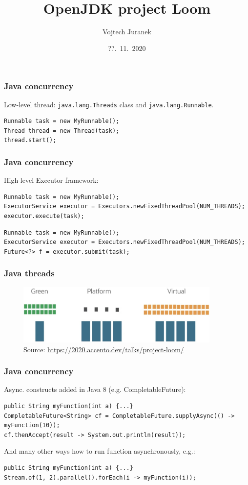 \documentclass[10pt,utf8]{beamer}
\title{OpenJDK project Loom}
\author{Vojtech Juranek}
\institute[Red Hat]{oVirt storage team}
\date{??.~11.~2020}
\begin{document}
\begin{frame}
	\titlepage
\end{frame}

\begin{frame}[fragile]
    \frametitle{Java concurrency}
    Low-level thread: \texttt{java.lang.Threads} class and \texttt{java.lang.Runnable}.
    \begin{lstlisting}[style=java]
Runnable task = new MyRunnable();
Thread thread = new Thread(task);
thread.start();
    \end{lstlisting}
\end{frame}

\begin{frame}[fragile]
    \frametitle{Java concurrency}
    High-level Executor framework:
    \begin{lstlisting}[style=java]
Runnable task = new MyRunnable();
ExecutorService executor = Executors.newFixedThreadPool(NUM_THREADS);
executor.execute(task);
    \end{lstlisting}
    
    \vspace{0.5cm}
    \begin{lstlisting}[style=java]
Runnable task = new MyRunnable();
ExecutorService executor = Executors.newFixedThreadPool(NUM_THREADS);
Future<?> f = executor.submit(task);
    \end{lstlisting}
\end{frame}

\begin{frame}
    \frametitle{Java threads    }
    \begin{figure}
        \centering
        \includegraphics[height=3cm]{./img/thread_history.eps}
        \caption{\tiny{Source: \url{https://2020.accento.dev/talks/project-loom/}}}
    \end{figure}
\end{frame}

\begin{frame}[fragile]
    \frametitle{Java concurrency}
    Async. constructs added in Java 8 (e.g. CompletableFuture):
    \begin{lstlisting}[style=java]
public String myFunction(int a) {...}
CompletableFuture<String> cf = CompletableFuture.supplyAsync(() -> myFunction(10));
cf.thenAccept(result -> System.out.println(result));
    \end{lstlisting}
And many other ways how to run function asynchronously, e.g.:
    \begin{lstlisting}[style=java]
public String myFunction(int a) {...}
Stream.of(1, 2).parallel().forEach(i -> myFunction(i));
    \end{lstlisting}
\end{frame}
\end{document}
